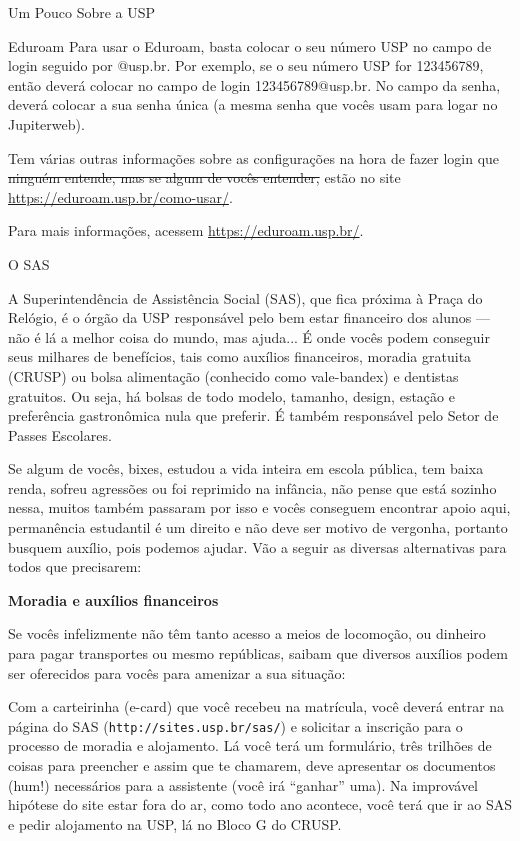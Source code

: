 \begin{secao}{Um Pouco Sobre a USP}
\begin{subsecao}{Eduroam}
Para usar o Eduroam, basta colocar o seu número USP no campo de login seguido por
@usp.br. Por exemplo, se o seu número USP for 123456789, então deverá colocar no
campo de login 123456789@usp.br. No campo da senha, deverá colocar a sua senha única
(a mesma senha que vocês usam para logar no Jupiterweb).

Tem várias outras informações sobre as configurações na hora de fazer login que
\sout{ninguém entende, mas se algum de vocês entender,} estão no site
\url{https://eduroam.usp.br/como-usar/}.

Para mais informações, acessem \url{https://eduroam.usp.br/}.

\end{subsecao}

\begin{subsecao}{O SAS}

A Superintendência de Assistência Social (SAS), que fica próxima à Praça do
Relógio, é o órgão da USP responsável pelo bem estar financeiro dos alunos — não
é lá a melhor coisa do mundo, mas ajuda... É onde vocês podem conseguir seus
milhares de benefícios, tais como auxílios financeiros, moradia gratuita (CRUSP)
ou bolsa alimentação (conhecido como vale-bandex) e dentistas gratuitos. Ou
seja, há bolsas de todo modelo, tamanho, design, estação e preferência
gastronômica nula que preferir. É também responsável pelo Setor de Passes
Escolares.

Se algum de vocês, bixes, estudou a vida inteira em escola pública, tem baixa renda,
sofreu agressões ou foi reprimido na infância, não pense que está sozinho nessa,
muitos também passaram por isso e vocês conseguem encontrar apoio aqui, permanência
estudantil é um direito e não deve ser motivo de vergonha, portanto busquem
auxílio, pois podemos ajudar. Vão a seguir as diversas alternativas para todos 
que precisarem:

{\bf Moradia e auxílios financeiros}

Se vocês infelizmente não têm tanto acesso a meios de locomoção, ou dinheiro para
pagar transportes ou mesmo repúblicas, saibam que diversos auxílios podem ser
oferecidos para vocês para amenizar a sua situação:

Com a carteirinha (e-card) que você recebeu na matrícula, você deverá entrar
na página do SAS ({\tt http://sites.usp.br/sas/}) e solicitar a inscrição
para o processo de moradia e alojamento. Lá você terá um formulário, três
trilhões de coisas para preencher e assim que te chamarem, deve apresentar os
documentos (hum!) necessários para a assistente (você irá “ganhar” uma). Na
improvável hipótese do site estar fora do ar, como todo ano acontece, você terá
que ir ao SAS e pedir alojamento na USP, lá no Bloco G do CRUSP.


\end{subsecao}
\end{secao}
